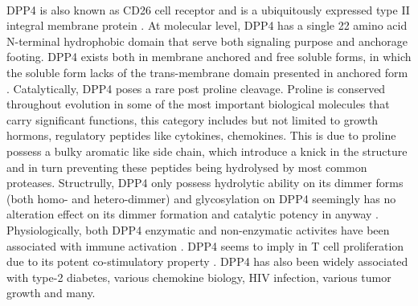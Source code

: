 \\
DPP4 is also known as CD26 cell receptor \cite{Abbott:2000qr} and is a ubiquitously expressed type II integral membrane protein \cite{Mentlein_1999}. At molecular level, DPP4 has a single 22 amino acid N-terminal hydrophobic domain that serve both signaling purpose and anchorage footing. \cite{Mentlein_1999, Abbott_2002} DPP4 exists both in membrane anchored and free soluble forms, in which the soluble form lacks of the trans-membrane domain presented in anchored form \cite{Lambeir:2001ab,Abbott:2000qr}. Catalytically, DPP4 poses a rare post proline cleavage. Proline is conserved throughout evolution in some of the most important biological molecules that carry significant functions, this category includes but not limited to growth hormons, regulatory peptides like cytokines, chemokines. This is due to proline possess a bulky aromatic like side chain, which introduce a knick in the structure and in turn preventing these peptides being hydrolysed by most common proteases. Structrully, DPP4 only possess hydrolytic ability on its dimmer forms (both homo- and hetero-dimmer) and glycosylation on DPP4 seemingly has no alteration effect on its dimmer formation and catalytic potency in anyway \cite{Aertgeerts:2004aa}. 
\\
Physiologically, both DPP4 enzymatic and non-enzymatic activites have been associated with immune activation \cite{Abbott:2000qr}. DPP4 seems to imply in T cell proliferation due to its potent co-stimulatory property \cite{Mentlein_1999}. DPP4 has also been widely associated with type-2 diabetes, various chemokine biology, HIV infection, various tumor growth and many. 
\\
